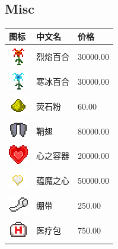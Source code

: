 \documentclass[UTF8]{ctexart}
\begin{document}
\subsection{Misc}
\begin{longtable}[]{|p{1cm}|p{8cm}|p{1.5cm}|}
\toprule
图标 & 中文名 & 价格\\
\midrule
	\includegraphics{.workspace/icons/iceandfire/iceandfire__fire_lily__0.png} & 烈焰百合 &30000.00\\
	\hline
	\includegraphics{.workspace/icons/iceandfire/iceandfire__frost_lily__0.png} & 寒冰百合 &30000.00\\
	\hline
	\includegraphics{.workspace/icons/minecraft/minecraft__glowstone_dust__0.png} & 荧石粉 &60.00\\
	\hline
	\includegraphics{.workspace/icons/minecraft/minecraft__elytra__0.png} & 鞘翅 &80000.00\\
	\hline
	\includegraphics{.workspace/icons/scalinghealth/scalinghealth__heartcontainer__0.png} & 心之容器 &20000.00\\
	\hline
	\includegraphics{.workspace/icons/scalinghealth/scalinghealth__difficultychanger__0.png} & 蕴魔之心 &50000.00\\
	\hline
	\includegraphics{.workspace/icons/scalinghealth/scalinghealth__healingitem__0.png} & 绷带 &250.00\\
	\hline
	\includegraphics{.workspace/icons/scalinghealth/scalinghealth__healingitem__1.png} & 医疗包 &750.00\\

\end{longtable}
\end{document}
